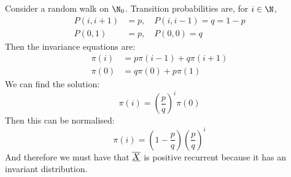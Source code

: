 \documentclass[../Main.tex]{subfiles}
\begin{document}
\begin{example}
    Consider a random walk on $\N_0$. Transition probabilities are, for $i \in \N$,
    \begin{align*}
        P(i, i+1) &= p,\quad P(i, i-1) = q = 1-p\\
        P(0, 1) &= p,\quad P(0, 0) = q
    \end{align*}
    Then the invariance equations are:
    \begin{align*}
        \pi(i) &= p\pi(i-1) + q \pi(i + 1) \\
        \pi(0) &= q\pi(0) + p\pi(1)
    \end{align*}
    We can find the solution:
    \begin{equation*}
        \pi(i) = \left(\frac{p}{q}\right)^i \pi(0)
    \end{equation*}
    Then this can be normalised:
    \begin{equation*}
        \pi(i) = \left(1 - \frac{p}{q}\right)\left(\frac{p}{q}\right)^i
    \end{equation*}
    And therefore we must have that $\underline{\overline{X}}$ is positive recurrent because it has an invariant distribution.
\end{example}
\end{document}
